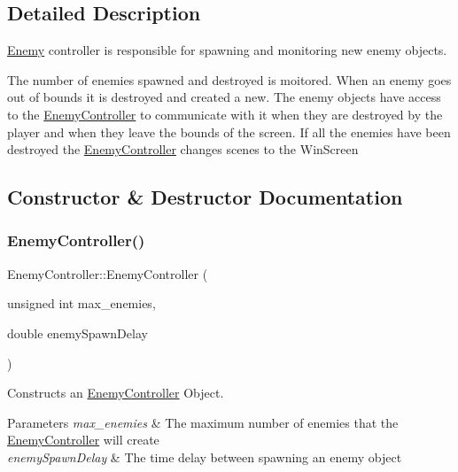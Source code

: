 \subsection{Detailed Description}
\hyperlink{class_enemy}{Enemy} controller is responsible for spawning and monitoring new enemy objects. 

The number of enemies spawned and destroyed is moitored. When an enemy goes out of bounds it is destroyed and created a new. The enemy objects have access to the \hyperlink{class_enemy_controller}{Enemy\+Controller} to communicate with it when they are destroyed by the player and when they leave the bounds of the screen. If all the enemies have been destroyed the \hyperlink{class_enemy_controller}{Enemy\+Controller} changes scenes to the Win\+Screen 

\subsection{Constructor \& Destructor Documentation}
\mbox{\label{class_enemy_controller_a3364fe98342c659a62633e9e003ef0f6}} 
\subsubsection{\texorpdfstring{Enemy\+Controller()}{EnemyController()}}
{\footnotesize\ttfamily Enemy\+Controller\+::\+Enemy\+Controller (\begin{DoxyParamCaption}\item[{unsigned int}]{max\+\_\+enemies,  }\item[{double}]{enemy\+Spawn\+Delay }\end{DoxyParamCaption})}



Constructs an \hyperlink{class_enemy_controller}{Enemy\+Controller} Object. 


\begin{DoxyParams}{Parameters}
{\em max\+\_\+enemies} & The maximum number of enemies that the \hyperlink{class_enemy_controller}{Enemy\+Controller} will create \\
\hline
{\em enemy\+Spawn\+Delay} & The time delay between spawning an enemy object \\
\hline
\end{DoxyParams}


